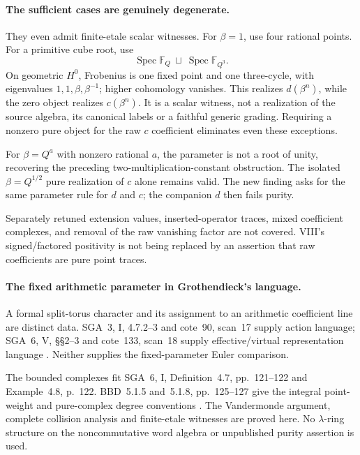 \paragraph{The sufficient cases are genuinely degenerate.}
They even admit finite-etale scalar witnesses.
For \(\beta=1\), use four rational points.
For a primitive cube root, use
\[
              \operatorname{Spec}\mathbb F_Q
                  \ \sqcup\
              \operatorname{Spec}\mathbb F_{Q^3}.
\]
On geometric \(H^0\), Frobenius is one fixed point
and one three-cycle, with eigenvalues
\(1,1,\beta,\beta^{-1}\); higher cohomology vanishes.
This realizes \(d(\beta^n)\), while the zero object
realizes \(c(\beta^n)\).
It is a scalar witness, not a realization of the
source algebra, its canonical labels or a faithful
generic grading. Requiring a nonzero pure object
for the raw \(c\) coefficient eliminates even these
exceptions.

For \(\beta=Q^a\) with nonzero rational \(a\),
the parameter is not a root of unity, recovering
the preceding two-multiplication-constant obstruction.
The isolated \(\beta=Q^{1/2}\) pure realization of
\(c\) alone remains valid. The new finding asks for
the same parameter rule for \(d\) and \(c\); the
companion \(d\) then fails purity.

Separately retuned extension values, inserted-operator
traces, mixed coefficient complexes, and removal
of the raw vanishing factor are not covered.
VIII's signed/factored positivity is not being
replaced by an assertion that raw coefficients are
pure point traces.

\paragraph{The fixed arithmetic parameter in Grothendieck's language.}
A formal split-torus character and its assignment to
an arithmetic coefficient line are distinct data.
SGA~3, I, 4.7.2--3 and cote~90, scan~17 supply
action language; SGA~6, V, \S\S2--3 and cote~133,
scan~18 supply effective/virtual representation
language \cite{SGA3,SGA6,Archive}.
Neither supplies the fixed-parameter Euler comparison.

The bounded complexes fit SGA~6, I, Definition~4.7,
pp.~121--122 and Example~4.8, p.~122.
BBD~5.1.5 and~5.1.8, pp.~125--127 give the integral
point-weight and pure-complex degree conventions
\cite{SGA6,BBD}.
The Vandermonde argument, complete collision analysis
and finite-etale witnesses are proved here.
No \(\lambda\)-ring structure on the noncommutative
word algebra or unpublished purity assertion is used.

